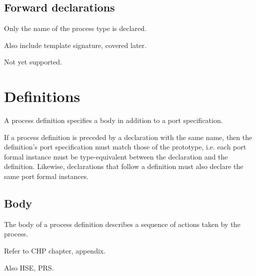 \subsection{Forward declarations}
\label{sec:process:declarations:forward}

Only the name of the process type is declared.  

Also include template signature, covered later.  

Not yet supported.  

\section{Definitions}
\label{sec:process:definitions}

A process definition specifies a body in addition to a port specification.  

If a process definition is preceded by a declaration with the same name, 
then the definition's port specification must match those of the prototype, 
i.e. each port formal instance must be type-equivalent between the 
declaration and the definition.  
Likewise, declarations that follow a definition must also 
declare the same port formal instances.  


\subsection{Body}
\label{sec:process:definitions:body}

The body of a process definition describes a sequence of actions
taken by the process.  

Refer to CHP chapter, appendix.  

Also HSE, PRS.  


